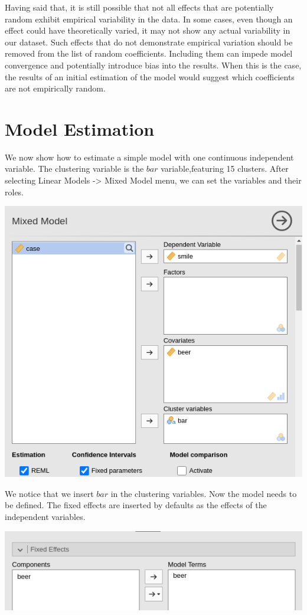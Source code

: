 \documentclass[
]{book}
\begin{document}
Having said that, it is still possible that not all effects that are potentially random exhibit empirical variability in the data. In some cases, even though an effect could have theoretically varied, it may not show any actual variability in our dataset. Such effects that do not demonstrate empirical variation should be removed from the list of random coefficients. Including them can impede model convergence and potentially introduce bias into the results. When this is the case, the results of an initial estimation of the model would suggest which coefficients are not empirically random.

\hypertarget{model-estimation-3}{%
\section{Model Estimation}\label{model-estimation-3}}

We now show how to estimate a simple model with one continuous independent variable. The clustering variable is the \(bar\) variable,featuring 15 clusters. After selecting {Linear Models -\textgreater{} Mixed Model} menu, we can set the variables and their roles.

\includegraphics[width=0.7\linewidth]{bookletpics/4_simple_input1}

We notice that we insert \(bar\) in the clustering variables. Now the model needs to be defined. The fixed effects are inserted by defaults as the effects of the independent variables.

\includegraphics[width=0.7\linewidth]{bookletpics/4_simple_input2}
\end{document}
